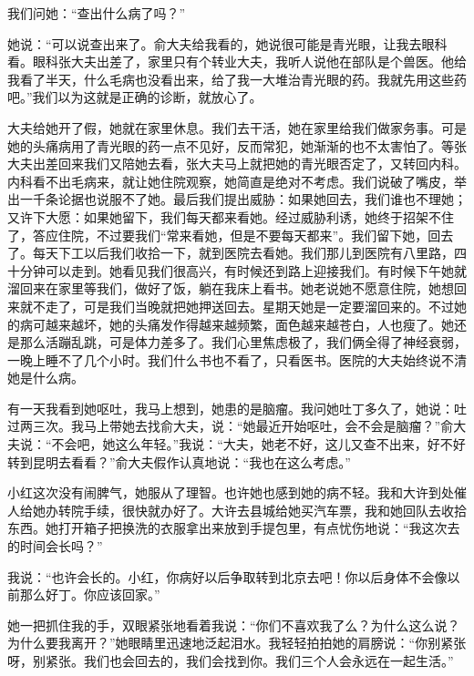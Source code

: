 我们问她：“查出什么病了吗？” 

她说：“可以说查出来了。俞大夫给我看的，她说很可能是青光眼，让我去眼科看。眼科张大夫出差了，家里只有个转业大夫，我听人说他在部队是个兽医。他给我看了半天，什么毛病也没看出来，给了我一大堆治青光眼的药。我就先用这些药吧。”我们以为这就是正确的诊断，就放心了。 

大夫给她开了假，她就在家里休息。我们去干活，她在家里给我们做家务事。可是她的头痛病用了青光眼的药一点不见好，反而常犯，她渐渐的也不太害怕了。等张大夫出差回来我们又陪她去看，张大夫马上就把她的青光眼否定了，又转回内科。内科看不出毛病来，就让她住院观察，她简直是绝对不考虑。我们说破了嘴皮，举出一千条论据也说服不了她。最后我们提出威胁：如果她回去，我们谁也不理她；又许下大愿：如果她留下，我们每天都来看她。经过威胁利诱，她终于招架不住了，答应住院，不过要我们“常来看她，但是不要每天都来”。我们留下她，回去了。每天下工以后我们收拾一下，就到医院去看她。我们那儿到医院有八里路，四十分钟可以走到。她看见我们很高兴，有时候还到路上迎接我们。有时候下午她就溜回来在家里等我们，做好了饭，躺在我床上看书。她老说她不愿意住院，她想回来就不走了，可是我们当晚就把她押送回去。星期天她是一定要溜回来的。不过她的病可越来越坏，她的头痛发作得越来越频繁，面色越来越苍白，人也瘦了。她还是那么活蹦乱跳，可是体力差多了。我们心里焦虑极了，我们俩全得了神经衰弱，一晚上睡不了几个小时。我们什么书也不看了，只看医书。医院的大夫始终说不清她是什么病。 

有一天我看到她呕吐，我马上想到，她患的是脑瘤。我问她吐丁多久了，她说：吐过两三次。我马上带她去找俞大夫，说：“她最近开始呕吐，会不会是脑瘤？”俞大夫说：“不会吧，她这么年轻。”我说：“大夫，她老不好，这儿又查不出来，好不好转到昆明去看看？”俞大夫假作认真地说：“我也在这么考虑。” 

小红这次没有闹脾气，她服从了理智。也许她也感到她的病不轻。我和大许到处催人给她办转院手续，很快就办好了。大许去县城给她买汽车票，我和她回队去收拾东西。她打开箱子把换洗的衣服拿出来放到手提包里，有点忧伤地说：“我这次去的时间会长吗？” 

我说：“也许会长的。小红，你病好以后争取转到北京去吧！你以后身体不会像以前那么好丁。你应该回家。” 

她一把抓住我的手，双眼紧张地看着我说：“你们不喜欢我了么？为什么这么说？为什么要我离开？”她眼睛里迅速地泛起泪水。我轻轻拍拍她的肩膀说：“你别紧张呀，别紧张。我们也会回去的，我们会找到你。我们三个人会永远在一起生活。” 

